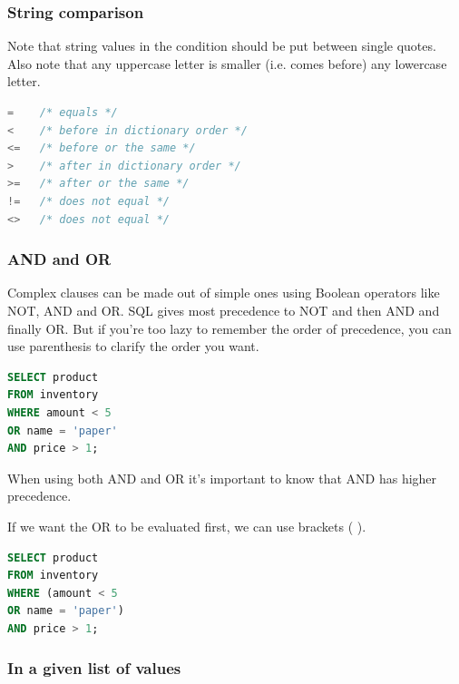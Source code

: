 \documentclass{article}
\begin{document}
\subsubsection{String comparison}

Note that string values in the condition should be put between single quotes. Also note that any uppercase letter is smaller (i.e. comes before) any lowercase letter.

\vspace{8pt} \begin{lstlisting}[language=SQL]
=    /* equals */
<    /* before in dictionary order */
<=   /* before or the same */
>    /* after in dictionary order */
>=   /* after or the same */
!=   /* does not equal */
<>   /* does not equal */ 
\end{lstlisting} \vspace{8pt}

\subsubsection{AND and OR}

Complex clauses can be made out of simple ones using Boolean operators like NOT, AND and OR. SQL gives most precedence to NOT and then AND and finally OR. But if you’re too lazy to remember the order of precedence, you can use parenthesis to clarify the order you want.

\vspace{8pt} \begin{lstlisting}[language=SQL]
SELECT product
FROM inventory
WHERE amount < 5
OR name = 'paper'
AND price > 1;
\end{lstlisting} \vspace{8pt}

When using both AND and OR it's important to know that AND has higher precedence.

If we want the OR to be evaluated first, we can use brackets ( ).

\vspace{8pt} \begin{lstlisting}[language=SQL]
SELECT product
FROM inventory
WHERE (amount < 5
OR name = 'paper')
AND price > 1;
\end{lstlisting} \vspace{8pt}

\subsubsection{In a given list of values}
\end{document}
